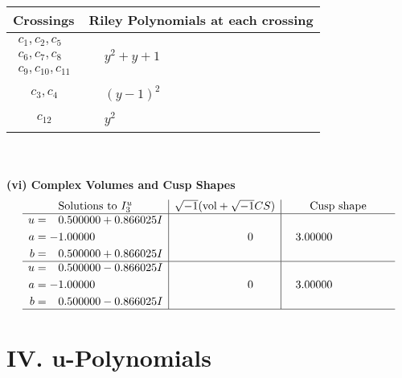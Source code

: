 \documentclass[1p]{elsarticle_modified}
\theoremstyle{definition}
\newcommand{\I}{\sqrt{-1}}
\begin{document}
\begin{tabular}{m{50pt}|m{274pt}}
Crossings & \hspace{64pt}Riley Polynomials at each crossing \\
\hline $$\begin{aligned}c_{1},c_{2},c_{5}\\c_{6},c_{7},c_{8}\\c_{9},c_{10},c_{11}\end{aligned}$$&$\begin{aligned}
&y^2+y+1
\end{aligned}$\\
\hline $$\begin{aligned}c_{3},c_{4}\end{aligned}$$&$\begin{aligned}
&(y-1)^2
\end{aligned}$\\
\hline $$\begin{aligned}c_{12}\end{aligned}$$&$\begin{aligned}
&y^2
\end{aligned}$\\
\hline
\end{tabular}\\~\\
\newpage\flushleft \textbf{(vi) Complex Volumes and Cusp Shapes}
$$\begin{array}{c|c|c}  
\text{Solutions to }I^u_{3}& \I (\text{vol} + \sqrt{-1}CS) & \text{Cusp shape}\\
 \hline 
\begin{aligned}
u &= \phantom{-}0.500000 + 0.866025 I \\
a &= -1.00000\phantom{ +0.000000I} \\
b &= \phantom{-}0.500000 + 0.866025 I\end{aligned}
 & \phantom{-0.000000 } 0 & \phantom{-}3.00000\phantom{ +0.000000I} \\ \hline\begin{aligned}
u &= \phantom{-}0.500000 - 0.866025 I \\
a &= -1.00000\phantom{ +0.000000I} \\
b &= \phantom{-}0.500000 - 0.866025 I\end{aligned}
 & \phantom{-0.000000 } 0 & \phantom{-}3.00000\phantom{ +0.000000I}\\
 \hline 
 \end{array}$$\newpage
\newpage\renewcommand{\arraystretch}{1}
\centering \section*{ IV. u-Polynomials}
\end{document}
